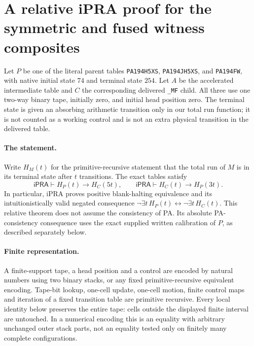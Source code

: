 \section{A relative iPRA proof for the symmetric and fused witness composites}
\label{sec:symmetric-mf}

Let $P$ be one of the literal parent tables
\texttt{PA194H5XS}, \texttt{PA194JH5XS}, and \texttt{PA194FW}, with native initial state $74$
and terminal state $254$.  Let $A$ be the accelerated intermediate table
and $C$ the corresponding delivered \texttt{\_MF} child.  All three use
one two-way binary tape, initially zero, and initial head position zero.
The terminal state is given an absorbing arithmetic transition only in
our total run function; it is not counted as a working control and is
not an extra physical transition in the delivered table.

\paragraph{The statement.}
Write $H_M(t)$ for the primitive-recursive statement that the total run
of $M$ is in its terminal state after $t$ transitions.  The exact tables
satisfy
\[
 \mathsf{iPRA}\vdash H_P(t)\longrightarrow H_C(5t),
 \qquad
 \mathsf{iPRA}\vdash H_C(t)\longrightarrow H_P(3t).
 \tag{SMF}
\]
In particular, iPRA proves positive blank-halting equivalence and its
intuitionistically valid negated consequence
$\neg\exists t\,H_P(t)\leftrightarrow\neg\exists t\,H_C(t)$.
This relative theorem does not assume the consistency of PA.
Its absolute PA-consistency consequence uses the exact supplied written
calibration of $P$, as described separately below.

\paragraph{Finite representation.}
A finite-support tape, a head position and a control are encoded by
natural numbers using two binary stacks, or any fixed primitive-recursive
equivalent encoding.  Tape-bit lookup, one-cell update, one-cell motion,
finite control maps and iteration of a fixed transition table are primitive
recursive.  Every local identity below preserves the entire tape: cells
outside the displayed finite interval are untouched.  In a numerical
encoding this is an equality with arbitrary unchanged outer stack parts,
not an equality tested only on finitely many complete configurations.

